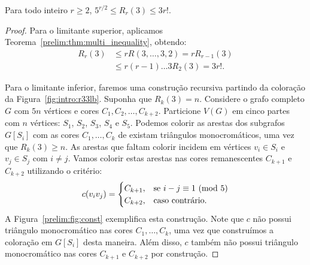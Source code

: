 \begin{theorem}
\label{prelim:thm:multi3ub} Para todo inteiro $r \geq 2$, $5^{r/2} \leq R_r(3) \leq 3 r!$.
\end{theorem}
\begin{proof}
Para o limitante superior, aplicamos Teorema~\ref{prelim:thm:multi_inequality}, obtendo:
\begin{align*}
R_{r}(3) &\leq rR(3,\dots,3,2) = rR_{r-1}(3) \\
&\leq r(r-1)\dots3 R_2(3) = 3r!.
\end{align*}

Para o limitante inferior, faremos uma construção recursiva partindo da coloração da Figura~\ref{fig:intro:r33lb}. Suponha que $R_k(3) = n$. Considere o grafo completo $G$ com $5n$ vértices e cores $C_1, C_2, \dots, C_{k+2}$. Particione $V(G)$ em cinco partes com $n$ vértices: $S_1$, $S_2$, $S_3$, $S_4$ e $S_5$.
Podemos colorir as arestas dos subgrafos $G[S_i]$ com as cores $C_1, \dots, C_k$ de existam triângulos monocromáticos, uma vez que $R_k(3) \geq n$. As arestas que faltam colorir incidem em vértices $v_i \in S_i$ e $v_j \in S_j$ com $i \neq j$. Vamos colorir estas arestas nas cores remanescentes $C_{k+1}$ e $C_{k+2}$ utilizando o critério:
\[c(v_i v_j) = \begin{cases}
  C_{k+1}, & \text{se } i - j \equiv 1 \ (\text{mod}\ 5) \\
  C_{k+2}, & \text{caso contrário}.
\end{cases}\]
A Figura~\ref{prelim:fig:const} exemplifica esta construção. Note que $c$ não possui triângulo monocromático nas cores $C_1, \dots, C_k$, uma vez que construímos a coloração em $G[S_i]$ desta maneira. Além disso, $c$ também não possui triângulo monocromático nas cores $C_{k+1}$ e $C_{k+2}$ por construção.


\end{proof}
